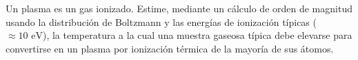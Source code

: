 \item Un plasma es un gas ionizado. Estime, mediante un cálculo de orden de magnitud usando la distribución de Boltzmann y las energías de ionización típicas ($\approx 10\text{ eV}$), la temperatura a la cual una muestra gaseosa típica debe elevarse para convertirse en un plasma por ionización térmica de la mayoría de sus átomos.